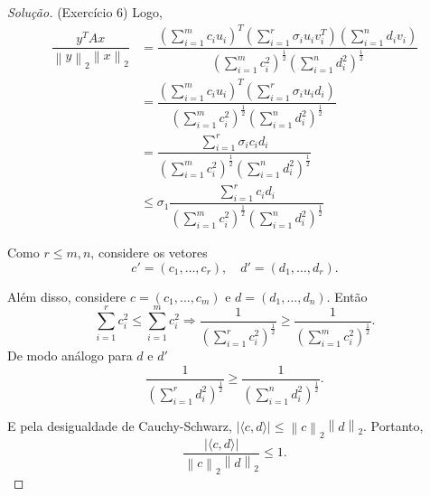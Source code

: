 \documentclass[a4paper,10pt]{article}
\newenvironment{solution}
  {\begin{proof}[Solução]}
  {\end{proof}}
\newcommand{\norm}[1]{\left\lVert#1\right\rVert}
\begin{document}
\begin{solution}{(Exercício 6)}
    Logo,
    \begin{equation}\label{eq:eqdes}
      \begin{split}
        \dfrac{y^TAx}{\norm{y}_2\norm{x}_2} &= \dfrac{\left( \sum_{i=1}^{m} c_i u_i\right)^T
        \left( \sum_{i=1}^{r} \sigma_iu_iv_i^T \right)
        \left( \sum_{i=1}^{n} d_i v_i\right)}{\left( \sum_{i=1}^{m}c_i^2 \right)^{\frac{1}{2}}
        \left(\sum_{i=1}^{n} d_i^2 \right)^{\frac{1}{2}} } \\
        &= \dfrac{\left( \sum_{i=1}^{m} c_i u_i \right)^T
        \left( \sum_{i=1}^{r} \sigma_i u_i d_i \right)}{\left( \sum_{i=1}^{m}c_i^2 \right)^{\frac{1}{2}}
        \left(\sum_{i=1}^{n} d_i^2 \right)^{\frac{1}{2}} } \\
        &= \dfrac{\sum_{i=1}^{r} \sigma_i c_i d_i}{\left( \sum_{i=1}^{m}c_i^2 \right)^{\frac{1}{2}}
        \left(\sum_{i=1}^{n} d_i^2 \right)^{\frac{1}{2}} } \\
        & \leq \sigma_1 \dfrac{\sum_{i=1}^{r} c_i d_i}{ \left( \sum_{i=1}^{m} c_i^2 \right)^{\frac{1}{2}}
        \left(\sum_{i=1}^{n} d_i^2 \right)^{\frac{1}{2}} }
      \end{split}
    \end{equation}

    Como $r \leq m,n$, considere os vetores
    \begin{equation*}
      c' = (c_1, \dots, c_r), \quad d' = (d_1, \dots, d_r).
    \end{equation*}

    Além disso, considere $c = (c_1, \dots, c_m)$ e $d = (d_1, \dots, d_n)$. Então
    \begin{equation*}
      \sum_{i=1}^{r} c_i^2 \leq \sum_{i=1}^{m} c_i^2 \Rightarrow
      \dfrac{1}{\left( \sum_{i=1}^{r} c_i^2 \right)^\frac{1}{2}} \geq
      \dfrac{1}{\left( \sum_{i=1}^{m} c_i^2 \right)^\frac{1}{2}}.
    \end{equation*}
    De modo análogo para $d$ e $d'$
    \begin{equation*}
      \dfrac{1}{\left( \sum_{i=1}^{r} d_i^2 \right)^\frac{1}{2}} \geq
      \dfrac{1}{\left( \sum_{i=1}^{n} d_i^2 \right)^\frac{1}{2}}.
    \end{equation*}

    E pela desigualdade de Cauchy-Schwarz, $|\langle c,d \rangle| \leq \norm{c}_2 \norm{d}_2$.
    Portanto,
    \begin{equation*}
      \frac{|\langle c,d \rangle|}{\norm{c}_2 \norm{d}_2} \leq 1.
    \end{equation*}


\end{solution}
\end{document}
